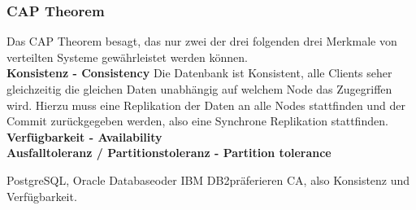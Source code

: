 
\subsubsection{CAP Theorem}
Das CAP Theorem besagt, das nur zwei der drei folgenden drei Merkmale von verteilten Systeme gewährleistet werden können\cite{EE6EQHU2}.
\\\textbf{Konsistenz - Consistency}
Die Datenbank ist Konsistent, alle Clients seher gleichzeitig die gleichen Daten unabhängig auf welchem Node das Zugegriffen wird.
Hierzu muss eine Replikation der Daten an alle Nodes stattfinden und der Commit zurückgegeben werden, also eine Synchrone Replikation stattfinden.
\\\textbf{Verfügbarkeit - Availability}
\\\textbf{Ausfalltoleranz / Partitionstoleranz - Partition tolerance}

\Gls{PostgreSQL}, \Gls{Oracle Database}oder \Gls{IBM DB2}präferieren CA, also Konsistenz und Verfügbarkeit.